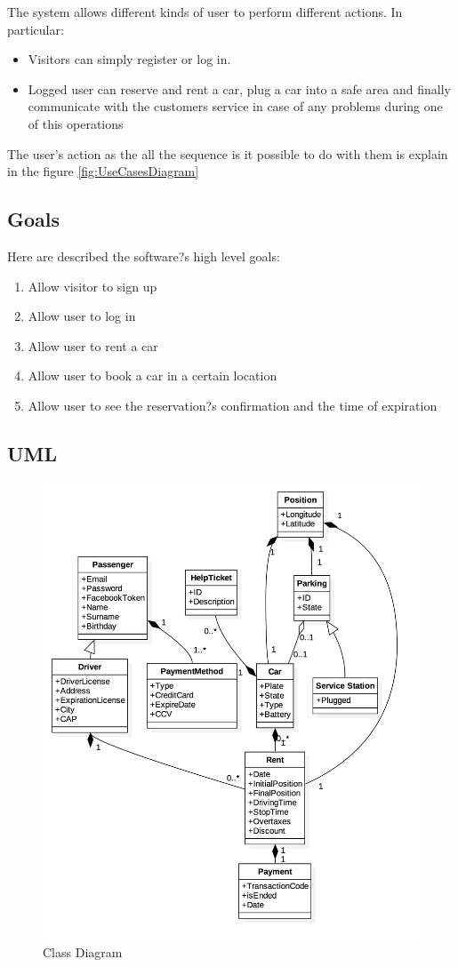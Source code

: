The system allows different kinds of user to perform different actions. In particular:
\begin{itemize}
	\item Visitors can simply register or log in.
	\item Logged user can reserve and rent a car, plug a car into a safe area and finally communicate with the customers service in case of any problems during one of this operations
\end{itemize}
The user's action as the all the sequence is it possible to do with them is explain in the figure \ref{fig:UseCasesDiagram}

\subsection{Goals}
Here are described the software?s high level goals:
\begin{enumerate}[label=\subscript{G}{\arabic*}]
	\item Allow visitor to sign up
	\item Allow user to log in
	\item Allow user to rent a car
	\item Allow user to book a car in a certain location
	\item Allow user to see the reservation?s confirmation and the time of expiration
\end{enumerate}

\subsection{UML}
\begin{figure}[H]
   \begin{center}
    \includegraphics[width=\textwidth]{Resources/UML.png}
    \caption{Class Diagram}
   \end{center}
    \label{fig:ClassDiagram}
\end{figure}
\vfill
\vfill
